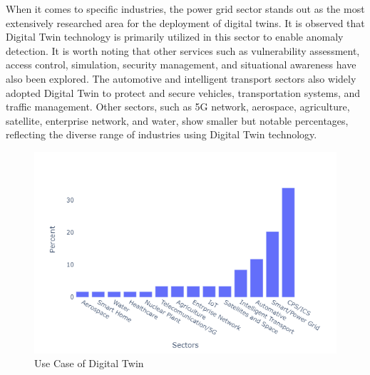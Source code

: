 When it comes to specific industries, the power grid sector stands out as the most extensively researched area for the deployment of digital twins. It is observed that Digital Twin technology is primarily utilized in this sector to enable anomaly detection. It is worth noting that other services such as vulnerability assessment, access control, simulation, security management, and situational awareness have also been explored. The automotive and intelligent transport sectors also widely adopted Digital Twin to protect and secure vehicles, transportation systems, and traffic management. Other sectors, such as 5G network, aerospace, agriculture, satellite, enterprise network, and water, show smaller but notable percentages, reflecting the diverse range of industries using Digital Twin technology. 

\begin{figure}[H]    
    \includegraphics[width=1\textwidth]{images/rt/dt-sector.png}
    \caption{Use Case of Digital Twin}
    \label{fig:sector}
\end{figure}




